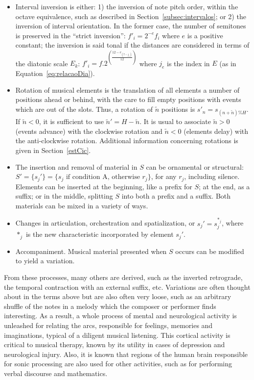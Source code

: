 \documentclass[format=acmsmall, review=false, screen=true]{acmart}
\begin{document}
\begin{itemize}
        \item Interval inversion is either: 1) the inversion of note pitch order, within the octave equivalence,
            such as described in Section~\ref{subsec:intervalos};
            or 2) the inversion of interval orientation. In the former case, the number of semitones
        is preserved in the ``strict inversion'': $f'_i = 2^{-e} f_i$ where $e$ is a positive constant;
        the inversion is said tonal if the distances are
        considered in terms of the diatonic scale $E_k$:
        $f'_i = f.2^{\left(\frac{12-e_{\left(7-j_e\right)}}{12}\right)}$
        where $j_e$ is the index in $E$ (as in Equation~\ref{eq:relacaoDia}).

        \item Rotation of musical elements is the translation of all elements
        a number of positions ahead or behind, with the care to fill empty positions
        with events which are out of the slots. Thus, a
        rotation of $\tilde{n}$ positions is $s'_n=s_{(n+\tilde{n})\%H}$. If
        $\tilde{n}<0$, it is sufficient to use $\tilde{n}'=H-\tilde{n}$. It is
        usual to associate $\tilde{n}>0$ (events advance) with the clockwise rotation and
        $\tilde{n}<0$ (elements delay) with the anti-clockwise rotation.
        Additional information concerning rotations is given in Section~\ref{estCic}.

        \item The insertion and removal of material in $S$ can be
    ornamental or structural: $S'=\{s_j'\}=\{s_j \text{ if condition A,
    otherwise } r_j\}$, for any $r_j$, including silence.
    Elements can be inserted at the beginning, like a prefix
    for $S$; at the end, as a suffix; or in the middle, splitting $S$ into both
    a prefix and a suffix. Both materials can be mixed in a variety of ways.

    \item Changes in articulation, orchestration and spatialization, or
    $s_j'=s_j^{*_j}$, where $*_j$ is the new characteristic incorporated by 
    element $s_j'$.
    
    \item Accompaniment.
        Musical material presented when $S$ occurs can be modified to yield a variation.
\end{itemize}

From these processes, many others are derived, such as the inverted retrograde, the temporal contraction with an external suffix, etc.
Variations are often thought about in the terms above but are also often very loose,
such as an arbitrary shuffle of the notes in a melody which the composer or performer finds interesting.
As a result, a whole process of mental and neurological activity is unleashed for relating the arcs, responsible for feelings, memories and imaginations, typical of a diligent musical listening.
This cortical activity is critical to
musical therapy, known by its utility in cases of depression and neurological injury.
Also, it is known that regions of the human brain responsible for sonic processing are also used for other activities,
such as for performing verbal discourse and mathematics.~\cite{Sacks,Roederer}
\end{document}
